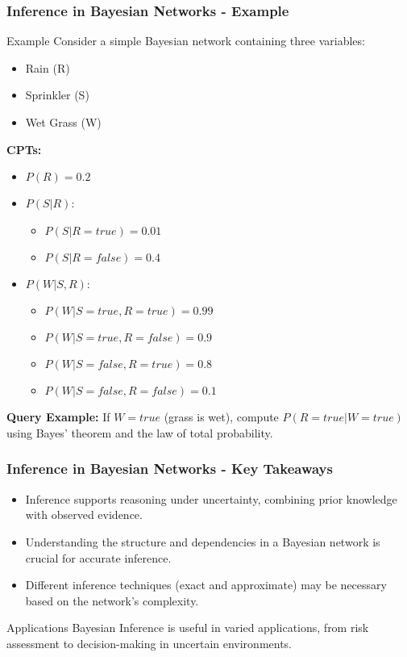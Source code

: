 \documentclass[aspectratio=169]{beamer}
\begin{document}
\begin{frame}[fragile]
    \frametitle{Inference in Bayesian Networks - Example}
    \begin{block}{Example}
        Consider a simple Bayesian network containing three variables:
        \begin{itemize}
            \item Rain (R)
            \item Sprinkler (S)
            \item Wet Grass (W)
        \end{itemize}
        
        \textbf{CPTs:}
        \begin{itemize}
            \item \( P(R) = 0.2 \)
            \item \( P(S|R) \):
            \begin{itemize}
                \item \( P(S|R=true) = 0.01 \)
                \item \( P(S|R=false) = 0.4 \)
            \end{itemize}
            \item \( P(W|S,R) \):
            \begin{itemize}
                \item \( P(W|S=true,R=true) = 0.99 \)
                \item \( P(W|S=true,R=false) = 0.9 \)
                \item \( P(W|S=false,R=true) = 0.8 \)
                \item \( P(W|S=false,R=false) = 0.1 \)
            \end{itemize}
        \end{itemize}
        
        \textbf{Query Example:} If \( W=true \) (grass is wet), compute \( P(R=true|W=true) \) using Bayes' theorem and the law of total probability.
    \end{block}
\end{frame}

\begin{frame}[fragile]
    \frametitle{Inference in Bayesian Networks - Key Takeaways}
    \begin{itemize}
        \item Inference supports reasoning under uncertainty, combining prior knowledge with observed evidence.
        \item Understanding the structure and dependencies in a Bayesian network is crucial for accurate inference.
        \item Different inference techniques (exact and approximate) may be necessary based on the network's complexity.
    \end{itemize}
    
    \begin{block}{Applications}
        Bayesian Inference is useful in varied applications, from risk assessment to decision-making in uncertain environments.
    \end{block}
\end{frame}
\end{document}
